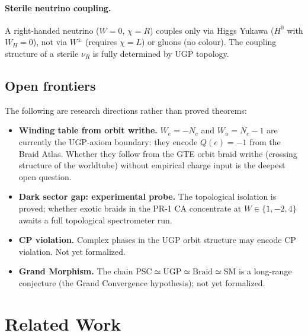 \documentclass[12pt]{article}
\theoremstyle{remark}
\begin{document}
\paragraph{Sterile neutrino coupling.}
A right-handed neutrino ($W = 0$, $\chi = R$) couples only via Higgs Yukawa
($H^0$ with $W_H = 0$), not via $W^\pm$ (requires $\chi = L$) or gluons (no
colour).  The coupling structure of a sterile $\nu_R$ is fully determined by
UGP topology.

\subsection{Open frontiers}

The following are research directions rather than proved theorems:
\begin{itemize}
  \item \textbf{Winding table from orbit writhe.}  $W_e = -N_c$ and
    $W_u = N_c - 1$ are currently the UGP-axiom boundary: they encode
    $Q(e) = -1$ from the Braid Atlas.  Whether they follow from the GTE orbit
    braid writhe (crossing structure of the worldtube) without empirical charge
    input is the deepest open question.

  \item \textbf{Dark sector gap: experimental probe.}  The topological
    isolation is proved; whether exotic braids in the PR-1 CA concentrate at
    $W \in \{1,-2,4\}$ awaits a full topological spectrometer run.

  \item \textbf{CP violation.}  Complex phases in the UGP orbit structure
    may encode CP violation.  Not yet formalized.

  \item \textbf{Grand Morphism.}  The chain
    $\mathrm{PSC} \simeq \mathrm{UGP} \simeq \mathrm{Braid} \simeq \mathrm{SM}$
    is a long-range conjecture (the Grand Convergence hypothesis); not yet
    formalized.
\end{itemize}

\section{Related Work}
\label{sec:related}
\end{document}
